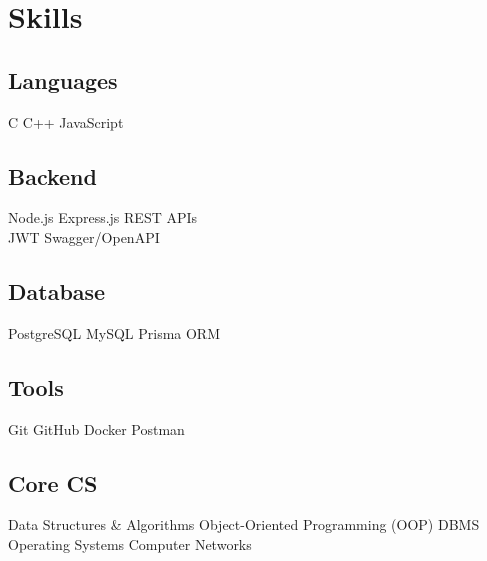\documentclass[]{deedy-resume-openfont}
\begin{document}

%
%

\begin{minipage}[t]{0.33\textwidth}


\section{Skills}

\subsection{Languages}
C \textbullet{} C++ \textbullet{} JavaScript  
\sectionsep

\subsection{Backend}
Node.js \textbullet{} Express.js \textbullet{} REST APIs \\
JWT \textbullet{} Swagger/OpenAPI
\sectionsep

\subsection{Database}
PostgreSQL \textbullet{} MySQL \textbullet{} Prisma ORM 
\sectionsep

\subsection{Tools}
Git \textbullet{} GitHub \textbullet{} Docker \textbullet{} Postman
\sectionsep

\subsection{Core CS}
Data Structures \& Algorithms \textbullet{} Object-Oriented Programming (OOP) \textbullet{} DBMS \textbullet{} Operating Systems \textbullet{} Computer Networks
\sectionsep



\end{minipage}
\end{document}
